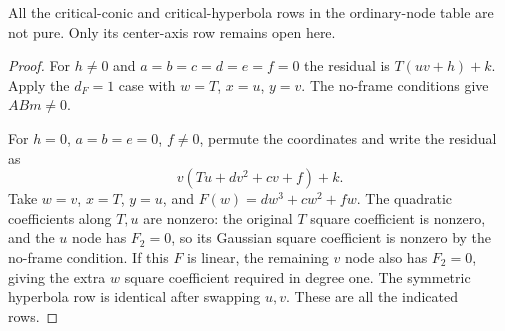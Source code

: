 \begin{corollary}\label{cor:ordinaryconics}
All the critical-conic and critical-hyperbola rows in the ordinary-node
table are not pure. Only its center-axis row remains open here.
\end{corollary}
\begin{proof}
For $h\ne0$ and $a=b=c=d=e=f=0$ the residual is
$T(uv+h)+k$. Apply the $d_F=1$ case with $w=T$, $x=u$, $y=v$.
The no-frame conditions give $ABm\ne0$.

For $h=0$, $a=b=e=0$, $f\ne0$, permute the coordinates and
write the residual as
\[
 v(Tu+d v^2+c v+f)+k.
\]
Take $w=v$, $x=T$, $y=u$, and
$F(w)=d w^3+c w^2+f w$. The quadratic coefficients along $T,u$
are nonzero: the original $T$ square coefficient is nonzero, and the $u$
node has $F_2=0$, so its Gaussian square coefficient is nonzero
by the no-frame condition. If this $F$ is linear, the remaining
$v$ node also has $F_2=0$, giving the extra $w$ square coefficient
required in degree one. The symmetric hyperbola row is identical
after swapping $u,v$. These are all the indicated rows.
\end{proof}
